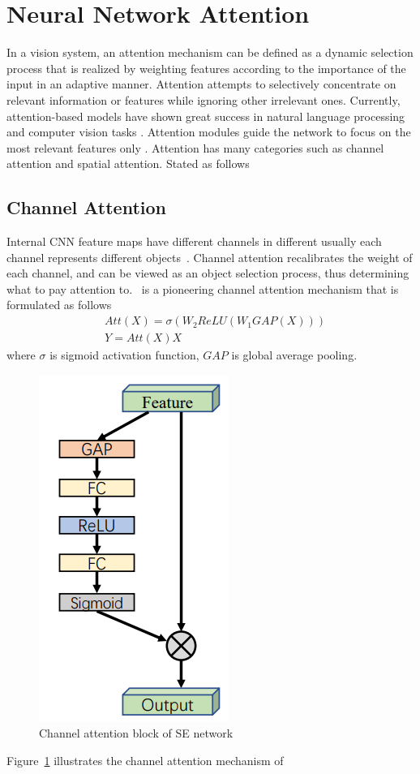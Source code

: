 \section{Neural Network Attention}
In a vision system, an attention mechanism can be defined as a dynamic selection process that is realized by weighting features according to the importance of the input in an adaptive manner. Attention attempts to selectively concentrate on relevant information or features while ignoring other irrelevant ones.  Currently, attention-based models have shown great success in natural language processing \cite{vaswani2017attention} and computer vision tasks \cite{guo2022attention}. Attention modules guide the network to focus on the most relevant features only \cite{guo2022attention}. Attention has many categories such as channel attention and spatial attention. Stated as follows 
\subsection{Channel Attention}
Internal CNN feature maps have different channels in different usually each channel represents different objects~\cite{chen2017sca}. Channel attention recalibrates the weight of each channel, and can be viewed as an object selection process, thus determining what to pay attention to.~\cite{hu2018squeeze} is a pioneering channel attention mechanism that is formulated as follows \cite{hu2018squeeze}
 \begin{equation}
    \begin{split}
        &Att(X) = \sigma(W_2ReLU(W_1GAP(X)))\\
        &Y = Att(X)X 
    \end{split}
\end{equation}
\noindent where $\sigma$ is sigmoid activation function, $GAP$ is global average pooling.
\begin{figure}
    \begin{center}
        \includegraphics[width=.3\textwidth]{Figures/SE_attentBlock.png}
        \caption{\label{fig:SE_block} Channel attention block of SE network}
    \end{center}
\end{figure}
Figure~\ref{fig:SE_block} illustrates the channel attention mechanism of~\cite{hu2018squeeze}
